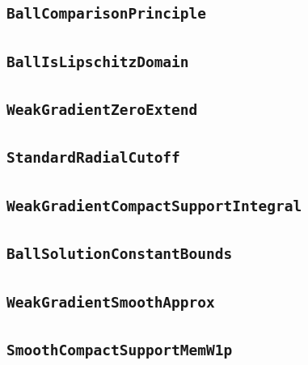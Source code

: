 \documentclass[11pt]{amsart}
\theoremstyle{definition}
\begin{document}
\subsection{\texorpdfstring{\texttt{BallComparisonPrinciple}}{BallComparisonPrinciple}}\label{node:BallComparisonPrinciple}


\subsection{\texorpdfstring{\texttt{BallIsLipschitzDomain}}{BallIsLipschitzDomain}}\label{node:BallIsLipschitzDomain}


\subsection{\texorpdfstring{\texttt{WeakGradientZeroExtend}}{WeakGradientZeroExtend}}\label{node:WeakGradientZeroExtend}


\subsection{\texorpdfstring{\texttt{StandardRadialCutoff}}{StandardRadialCutoff}}\label{node:StandardRadialCutoff}


\subsection{\texorpdfstring{\texttt{WeakGradientCompactSupportIntegral}}{WeakGradientCompactSupportIntegral}}\label{node:WeakGradientCompactSupportIntegral}


\subsection{\texorpdfstring{\texttt{BallSolutionConstantBounds}}{BallSolutionConstantBounds}}\label{node:BallSolutionConstantBounds}


\subsection{\texorpdfstring{\texttt{WeakGradientSmoothApprox}}{WeakGradientSmoothApprox}}\label{node:WeakGradientSmoothApprox}


\subsection{\texorpdfstring{\texttt{SmoothCompactSupportMemW1p}}{SmoothCompactSupportMemW1p}}\label{node:SmoothCompactSupportMemW1p}

\end{document}
